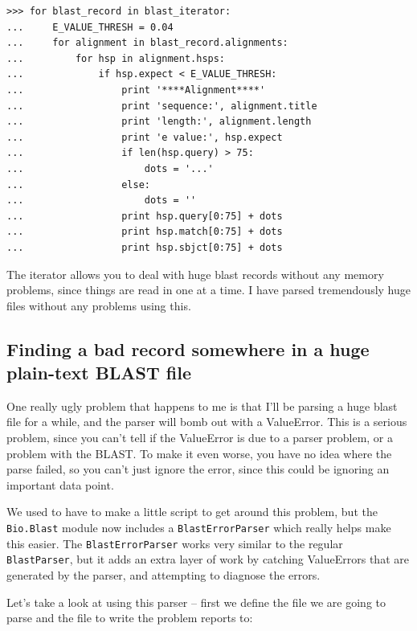 \documentclass{report}
\begin{document}
\begin{verbatim}
>>> for blast_record in blast_iterator:
...     E_VALUE_THRESH = 0.04
...     for alignment in blast_record.alignments:
...         for hsp in alignment.hsps:
...             if hsp.expect < E_VALUE_THRESH:
...                 print '****Alignment****'
...                 print 'sequence:', alignment.title
...                 print 'length:', alignment.length
...                 print 'e value:', hsp.expect
...                 if len(hsp.query) > 75:
...                     dots = '...'
...                 else:
...                     dots = ''
...                 print hsp.query[0:75] + dots
...                 print hsp.match[0:75] + dots
...                 print hsp.sbjct[0:75] + dots
\end{verbatim}


The iterator allows you to deal with huge blast records without any memory problems, since things are read in one at a time. I have parsed tremendously huge files without any problems using this.

\subsection{Finding a bad record somewhere in a huge plain-text BLAST file}

One really ugly problem that happens to me is that I'll be parsing a huge blast file for a while, and the parser will bomb out with a ValueError. This is a serious problem, since you can't tell if the ValueError is due to a parser problem, or a problem with the BLAST. To make it even worse, you have no idea where the parse failed, so you can't just ignore the error, since this could be ignoring an important data point.

We used to have to make a little script to get around this problem, but the \verb|Bio.Blast| module now includes a \verb|BlastErrorParser| which really helps make this easier. The \verb|BlastErrorParser| works very similar to the regular \verb|BlastParser|, but it adds an extra layer of work by catching ValueErrors that are generated by the parser, and attempting to diagnose the errors.

Let's take a look at using this parser -- first we define the file we are going to parse and the file to write the problem reports to:
\end{document}
